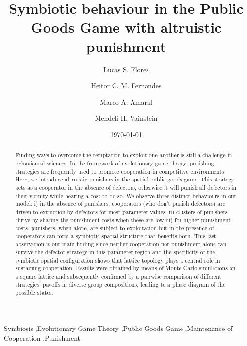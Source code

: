 \documentclass[5p]{elsarticle}
\date{\today}
\begin{document}
\begin{frontmatter}

\title{Symbiotic behaviour in the Public Goods Game with altruistic punishment}

\author[1]{Lucas S. Flores}
\author[1]{Heitor C. M. Fernandes}
\address[1]{Instituto de Física, Universidade Federal do Rio Grande do Sul, CP 15051, CEP 91501-970 Porto Alegre - RS, Brazil}
\author[2]{Marco A. Amaral}
\address[2]{Instituto de Humanidades, Artes e Ciências, Universidade Federal do Sul da Bahia, CEP 45638-000, Teixeira de Freitas - BA, Brazil.}
\author[1]{Mendeli H. Vainstein}

\begin{abstract}
Finding ways to overcome the temptation to exploit one another is still {a challenge in behavioural sciences}. In the framework of {evolutionary game theory}, punishing strategies are frequently used to promote cooperation in competitive environments. 
%
{Here, we introduce altruistic punishers in the spatial public goods game. This strategy acts as a cooperator in the absence of defectors, otherwise it will punish all defectors in their vicinity while bearing a cost to do so.}
%
We observe three distinct behaviours in our model: i) in the absence of punishers, cooperators {(who don't punish defectors)} are driven to extinction by defectors for most parameter values; ii) clusters of punishers thrive by sharing the punishment costs when these are low iii) for higher punishment costs, punishers, when alone, are subject to exploitation but in the presence of cooperators can form a symbiotic spatial structure that benefits both. 
This last observation is our main finding since neither cooperation nor punishment alone can survive the defector strategy in this parameter region and the specificity of the symbiotic spatial configuration shows that lattice topology plays a central role in sustaining cooperation. Results were obtained by means of  Monte Carlo simulations on a square lattice and subsequently confirmed by a {pairwise comparison of different strategies' payoffs in diverse group compositions,} leading to a phase diagram of the possible states.
\end{abstract}

\begin{keyword}
Symbiosis \sep Evolutionary Game Theory \sep Public Goods Game \sep Maintenance of Cooperation \sep Punishment
\end{keyword}
\end{frontmatter}
\end{document}
